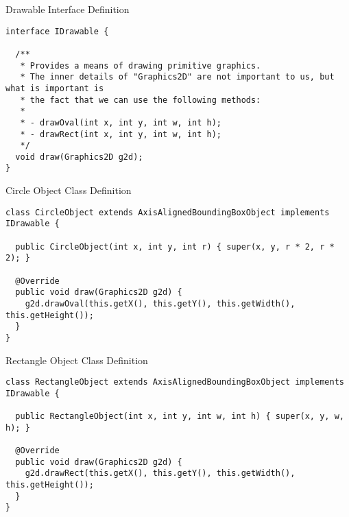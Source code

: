 \begin{cl}{Drawable Interface Definition}
\begin{lstlisting}[language=MyJava]
interface IDrawable {
  
  /**
   * Provides a means of drawing primitive graphics.
   * The inner details of "Graphics2D" are not important to us, but what is important is
   * the fact that we can use the following methods:
   * 
   * - drawOval(int x, int y, int w, int h);
   * - drawRect(int x, int y, int w, int h);
   */
  void draw(Graphics2D g2d); 
}
\end{lstlisting}
\end{cl} 

\begin{cl}{Circle Object Class Definition}
\begin{lstlisting}[language=MyJava]
class CircleObject extends AxisAlignedBoundingBoxObject implements IDrawable {
  
  public CircleObject(int x, int y, int r) { super(x, y, r * 2, r * 2); }

  @Override
  public void draw(Graphics2D g2d) {
    g2d.drawOval(this.getX(), this.getY(), this.getWidth(), this.getHeight());
  }
}
\end{lstlisting}
\end{cl}

\begin{cl}{Rectangle Object Class Definition}
\begin{lstlisting}[language=MyJava]
class RectangleObject extends AxisAlignedBoundingBoxObject implements IDrawable {
  
  public RectangleObject(int x, int y, int w, int h) { super(x, y, w, h); }
  
  @Override
  public void draw(Graphics2D g2d) {
    g2d.drawRect(this.getX(), this.getY(), this.getWidth(), this.getHeight());
  }
}
\end{lstlisting}
\end{cl}

